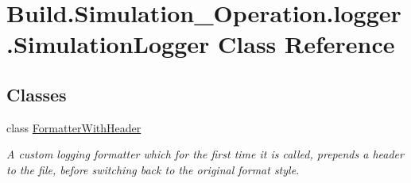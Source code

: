 \hypertarget{class_build_1_1_simulation___operation_1_1logger_1_1_simulation_logger}{}\section{Build.\+Simulation\+\_\+\+Operation.\+logger.\+Simulation\+Logger Class Reference}
\label{class_build_1_1_simulation___operation_1_1logger_1_1_simulation_logger}
\subsection*{Classes}
\begin{DoxyCompactItemize}
\item 
class \hyperlink{class_build_1_1_simulation___operation_1_1logger_1_1_simulation_logger_1_1_formatter_with_header}{Formatter\+With\+Header}
\begin{DoxyCompactList}\small\item\em A custom logging formatter which for the first time it is called, prepends a header to the file, before switching back to the original format style. \end{DoxyCompactList}\end{DoxyCompactItemize}
